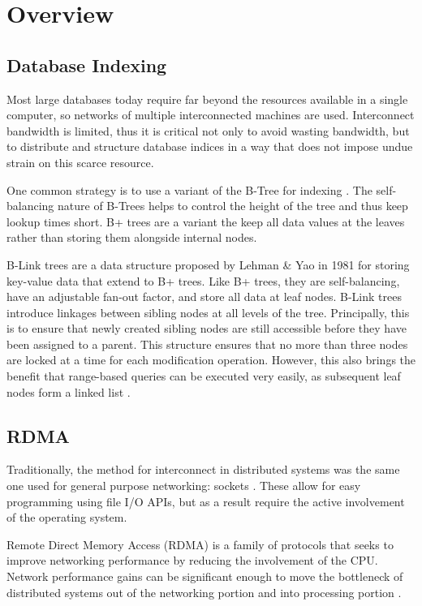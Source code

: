 \section{Overview}

\subsection{Database Indexing}
Most large databases today require far beyond the resources available in a single computer, so networks of multiple interconnected machines are used. Interconnect bandwidth is limited, thus it is critical not only to avoid wasting bandwidth, but to distribute and structure database indices in a way that does not impose undue strain on this scarce resource.

One common strategy is to use a variant of the B-Tree for indexing \cite{ma-tpds-2022}. The self-balancing nature of B-Trees helps to control the height of the tree and thus keep lookup times short. B+ trees are a variant the keep all data values at the leaves rather than storing them alongside internal nodes.

B-Link trees are a data structure proposed by Lehman \& Yao in 1981 for storing key-value data that extend to B+ trees. Like B+ trees, they are self-balancing, have an adjustable fan-out factor, and store all data at leaf nodes.
B-Link trees introduce linkages between sibling nodes at all levels of the tree. Principally, this is to ensure that newly created sibling nodes are still accessible before they have been assigned to a parent. This structure ensures that no more than three nodes are locked at a time for each modification operation. However, this also brings the benefit that range-based queries can be executed very easily, as subsequent leaf nodes form a linked list \cite{b-link}.


\subsection{RDMA}

Traditionally, the method for interconnect in distributed systems was the same one used for general purpose networking: sockets \cite{binnig-vldb-2016}. These allow for easy programming using file I/O APIs, but as a result require the active involvement of the operating system.

Remote Direct Memory Access (RDMA) is a family of protocols that seeks to improve networking performance by reducing the involvement of the CPU. Network performance gains can be significant enough to move the bottleneck of distributed systems out of the networking portion and into processing portion \cite{binnig-vldb-2016}.

